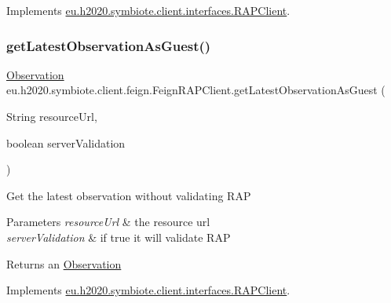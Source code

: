 Implements \hyperlink{interfaceeu_1_1h2020_1_1symbiote_1_1client_1_1interfaces_1_1RAPClient_a97d1282e2044da5a9eecdcff29a2f594}{eu.\+h2020.\+symbiote.\+client.\+interfaces.\+R\+A\+P\+Client}.

\mbox{\label{classeu_1_1h2020_1_1symbiote_1_1client_1_1feign_1_1FeignRAPClient_a32b3832b72beec30c0ae51f12449c5cf}} 
\subsubsection{\texorpdfstring{get\+Latest\+Observation\+As\+Guest()}{getLatestObservationAsGuest()}}
{\footnotesize\ttfamily \hyperlink{classeu_1_1h2020_1_1symbiote_1_1model_1_1cim_1_1Observation}{Observation} eu.\+h2020.\+symbiote.\+client.\+feign.\+Feign\+R\+A\+P\+Client.\+get\+Latest\+Observation\+As\+Guest (\begin{DoxyParamCaption}\item[{String}]{resource\+Url,  }\item[{boolean}]{server\+Validation }\end{DoxyParamCaption})}

Get the latest observation without validating R\+AP


\begin{DoxyParams}{Parameters}
{\em resource\+Url} & the resource url \\
\hline
{\em server\+Validation} & if true it will validate R\+AP \\
\hline
\end{DoxyParams}
\begin{DoxyReturn}{Returns}
an \hyperlink{}{Observation} 
\end{DoxyReturn}


Implements \hyperlink{interfaceeu_1_1h2020_1_1symbiote_1_1client_1_1interfaces_1_1RAPClient_a6d5ca4715e7681e52afe421f269aca66}{eu.\+h2020.\+symbiote.\+client.\+interfaces.\+R\+A\+P\+Client}.

\mbox{\label{classeu_1_1h2020_1_1symbiote_1_1client_1_1feign_1_1FeignRAPClient_a3d6649ccc28b76d9fe638263554e6eaf}} 
